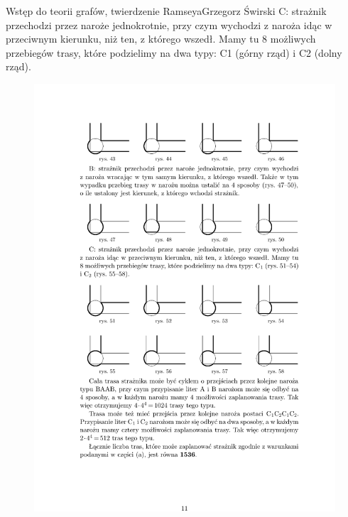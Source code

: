 \begin{referat}{Wstęp do teorii grafów, twierdzenie Ramseya}{Grzegorz Świrski}
C: strażnik przechodzi przez naroże jednokrotnie, przy czym wychodzi
z naroża idąc w przeciwnym kierunku, niż ten, z którego wszedł. Mamy tu
8 możliwych przebiegów trasy, które podzielimy na dwa typy: C1 (górny rząd)
i C2 (dolny rząd).
\begin{figure}[!h]
  \begin{flushright}
  \includegraphics[scale=1]{./swirski/ex6c.pdf}
  \end{flushright}
\end{figure}
\begin{figure}[!h]
  \begin{flushright}

\end{flushright}
\end{figure}
\end{referat}
